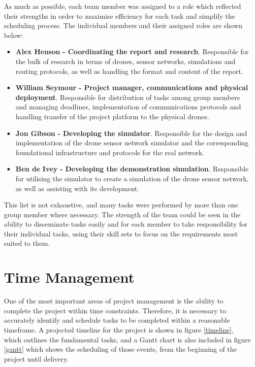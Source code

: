 As much as possible, each team member was assigned to a role which reflected their strengths in order to maximise efficiency for each task and simplify the scheduling process. The individual members and their assigned roles are shown below:

\begin{itemize}
\item \textbf{Alex Henson - Coordinating the report and research}. Responsible for the bulk of research in terms of drones, sensor networks, simulations and routing protocols, as well as handling the format and content of the report.

\item \textbf{William Seymour - Project manager, communications and physical deployment}. Responsible for distribution of tasks among group members and managing deadlines, implementation of communications  protocols and handling transfer of the project platform to the physical drones.

\item \textbf{Jon Gibson - Developing the simulator}. Responsible for the design and implementation of the drone sensor network simulator and the corresponding  foundational infrastructure and protocols for the real network.

\item \textbf{Ben de Ivey - Developing the demonstration simulation}. Responsible for utilising the simulator to create a simulation of the drone sensor network, as well as assisting with its development.
\end{itemize}

This list is not exhaustive, and many tasks were performed by more than one group member where necessary. The strength of the team could be seen in the ability to disseminate tasks easily and for each member to take responsibility for their individual tasks, using their skill sets to focus on the requirements most suited to them.

\section{Time Management}
One of the most important areas of project management is the ability to complete the project within time constraints. Therefore, it is necessary to accurately identify and schedule tasks to be completed within a reasonable timeframe. A projected timeline for the project is shown in figure \ref{timeline}, which outlines the fundamental tasks, and a Gantt chart is also included in figure \ref{gantt} which shows the scheduling of those events, from the beginning of the project until delivery. 

